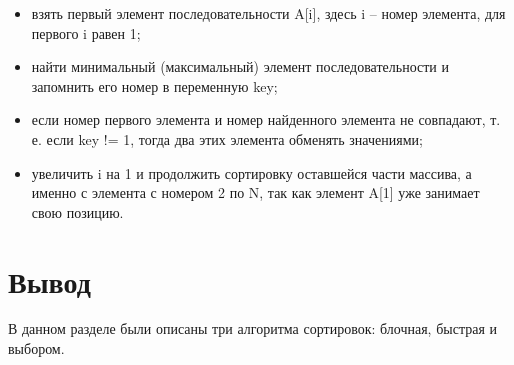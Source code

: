 \begin{itemize}
	\item взять первый элемент последовательности A[i], здесь i – номер элемента, для первого i равен 1;
	\item найти минимальный (максимальный) элемент последовательности и запомнить его номер в переменную key;
	\item если номер первого элемента и номер найденного элемента не совпадают, т. е. если key != 1, тогда два этих элемента обменять значениями;
	\item увеличить i на 1 и продолжить сортировку оставшейся части массива, а именно с элемента с номером 2 по N, так как элемент A[1] уже занимает свою позицию.
\end{itemize}


\section*{Вывод}

В данном разделе были описаны три алгоритма сортировок: блочная, быстрая и выбором.
